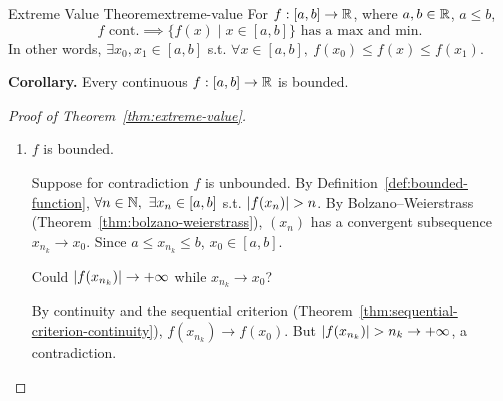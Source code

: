 \begin{theorem}{Extreme Value Theorem}{extreme-value}
  For $f:[a,b]\to\mathbb{R}$, where $a,b\in\mathbb{R}$, $a\le b$,
  \[
    f\text{ cont.}\implies \{f(x)\mid x\in[a,b]\}\text{ has a max and min.}
  \]
  In other words, $\exists x_0,x_1\in[a,b]$ s.t.
  $\forall x\in[a,b],\ f(x_0)\le f(x)\le f(x_1)$.
\end{theorem}

\textbf{Corollary.} Every continuous $f:[a,b]\to\mathbb{R}$ is bounded.

\begin{proof}[Proof of Theorem~\ref{thm:extreme-value}]
  \proofheadingbreak
  \begin{enumerate}[label=\textbf{Step \arabic*.}, proofparts]
    \item $f$ is bounded.\par\nopagebreak
          Suppose for contradiction $f$ is unbounded. By Definition~\ref{def:bounded-function},
          $\forall n\in\mathbb{N},\ \exists x_n\in[a,b]$ s.t. $\left\lvert f(x_n) \right\rvert>n$.
          By Bolzano--Weierstrass (Theorem~\ref{thm:bolzano-weierstrass}), $(x_n)$ has a
          convergent subsequence $x_{n_k}\to x_0$. Since $a\le x_{n_k}\le b$, $x_0\in[a,b]$.

          \begin{thinking}
            \centering
            \par
            Could $\left\lvert f(x_{n_k}) \right\rvert\to+\infty$ while $x_{n_k}\to x_0$?
          \end{thinking}
          By continuity and the sequential criterion (Theorem~\ref{thm:sequential-criterion-continuity}),
          $f(x_{n_k})\to f(x_0)$. But $\left\lvert f(x_{n_k}) \right\rvert>n_k\to+\infty$, a contradiction.


\end{enumerate}
\end{proof}
